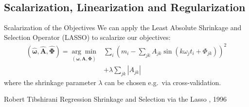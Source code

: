 \documentclass{beamer}
\begin{document}

\subsection{Scalarization, Linearization and Regularization}
\begin{frame}{Scalarization of the Objectives}
We can apply the Least Absolute Shrinkage and Selection Operator (LASSO) to scalarize our objectives:
\begin{align*}(\boldsymbol{\hat \omega}, \mathbf {\hat A}, \boldsymbol{\hat \Phi})
  = \underset{(\boldsymbol \omega, \mathbf A, \boldsymbol \Phi)}{\arg\min}
  & \sum_i \left(m_i - \sum_{jk} A_{jk } \sin \left(k \omega_j t_i + \Phi_{jk} \right) \right)^2
\\&+ \lambda \sum_{jk} |A_{jk}|
\end{align*}
where the shrinkage parameter $\lambda$ can be chosen e.g.~via cross-validation. 
\begin{thebibliography}{1}
  \beamertemplatearticlebibitems
    Robert Tibshirani
    \newblock Regression Shrinkage and Selection via the Lasso
    , 1996
    \end{thebibliography}
\end{frame}
\end{document}
